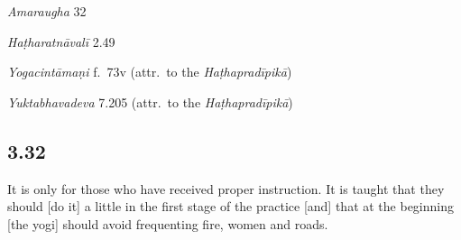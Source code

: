 \begin{ekdosis}
\begin{sources}[hp03_031]
\emph{Amaraugha} 32
\begin{versinnote}
\tl{\var{caiva ] caitad \vl}\\!}
\end{versinnote}
\end{sources}

\begin{testimonia}[hp03_031]
\emph{Haṭharatnāvalī} 2.49
\begin{versinnote}
\end{versinnote}

\emph{Yogacintāmaṇi} f.~73v (attr.~to the \emph{Haṭhapradīpikā})
\begin{versinnote}
\end{versinnote}

\emph{Yuktabhavadeva} 7.205 (attr.~to the \emph{Haṭhapradīpikā})
\begin{versinnote}
\end{versinnote}
\end{testimonia}


\subsection*{3.32}
\begin{translation}[hp03_032]
It is only for those who have received proper instruction. It is taught that they should [do it] a little in the first stage of the practice [and] that at the beginning [the yogi] should avoid frequenting fire, women and roads.
\end{translation}


\end{ekdosis}
